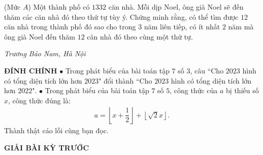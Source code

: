 \begin{multicols}{2}
	(Mức $A$) Một thành phố có $1332$ căn nhà. Mỗi dịp Noel, ông già Noel sẽ đến thăm các căn nhà đó theo thứ tự tùy ý. Chứng minh rằng, có thể tìm được $12$ căn nhà trong thành phố đó sao cho trong $3$ năm liên tiếp, có ít nhất $2$ năm mà ông già Noel đến thăm $12$ căn nhà đó theo cùng một thứ tự.
	\begin{flushright}
		\textit{Trương Bảo Nam, Hà Nội}
	\end{flushright}
	\textbf{\color{thachthuctoanhoc}ĐÍNH CHÍNH}
	\vskip 0.05cm
	$\bullet$ Trong phát biểu của bài toán {} tập $7$ số $3$, câu ``Cho $2023$ hình có tổng diện tích lớn hơn $2023$" đổi thành ``Cho $2023$ hình có tổng diện tích lớn hơn $2022$".
	\vskip 0.05cm
	$\bullet$ Trong phát biểu của bài toán {} tập $7$ số $5$, công thức của $a$ bị thiếu số $x$, công thức đúng là:
	\begin{align*}
		a=\left\lfloor x+\dfrac12\right\rfloor+\left\lfloor\sqrt{2}x\right\rfloor.
	\end{align*} 
	Thành thật cáo lỗi cùng bạn đọc.
\end{multicols}
\newpage
\centerline{{\large{\textbf{\color{thachthuctoanhoc}GIẢI BÀI KỲ TRƯỚC}}}}
\vspace*{-5pt}
